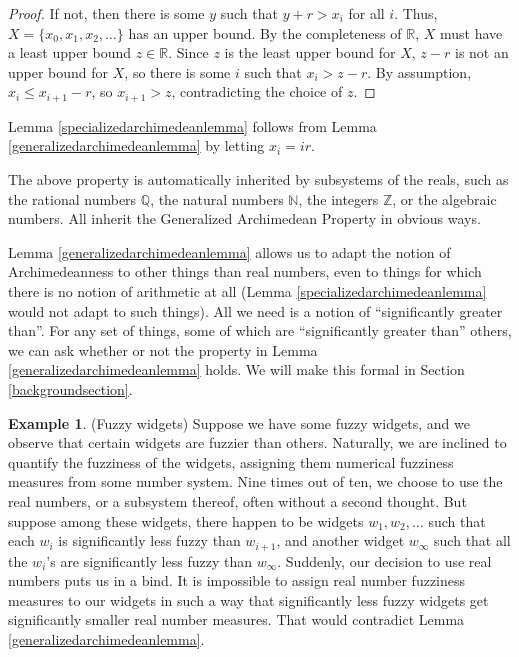 \documentclass[reqno]{article}
\theoremstyle{definition}
\newtheorem{example}[theorem]{Example}
\begin{document}
\begin{proof}
If not, then there is some $y$ such that $y+r > x_i$ for all $i$.
Thus, $X=\{x_0,x_1,x_2,\ldots\}$ has an upper bound. By the completeness
of $\mathbb R$, $X$ must have a least upper bound $z\in\mathbb R$.
Since $z$ is the least upper bound for $X$, $z-r$ is not an upper bound
for $X$, so there is some $i$ such that $x_i>z-r$.
By assumption, $x_i\leq x_{i+1}-r$, so $x_{i+1}>z$, contradicting the choice
of $z$.
\end{proof}

Lemma \ref{specializedarchimedeanlemma} follows from
Lemma \ref{generalizedarchimedeanlemma} by letting $x_i=ir$.

The above property is automatically inherited by subsystems
of the reals, such as the rational numbers $\mathbb Q$, the natural
numbers $\mathbb N$, the integers $\mathbb Z$, or the algebraic numbers.
All inherit the Generalized Archimedean Property in obvious ways.

Lemma \ref{generalizedarchimedeanlemma} allows us to adapt the notion
of Archimedeanness to other things than real numbers, even to things
for which there is no notion of arithmetic at all
(Lemma \ref{specializedarchimedeanlemma} would not adapt to such things).
All we need is a notion of ``significantly greater than''.
For any set of things, some of which are ``significantly greater than''
others, we can ask whether or not the property in Lemma
\ref{generalizedarchimedeanlemma} holds. We will make this formal in
Section \ref{backgroundsection}.

\begin{example}
\label{fuzzywidgets}
(Fuzzy widgets)
Suppose we have some fuzzy widgets, and we observe that certain
widgets are fuzzier than others. Naturally, we are inclined to
quantify the fuzziness of the widgets, assigning them numerical
fuzziness measures from some number system. Nine times out of ten,
we choose to use the real numbers, or a subsystem thereof,
often without a second thought. But suppose
among these widgets, there happen to be widgets $w_1,w_2,\ldots$
such that each $w_{i}$ is significantly less fuzzy than $w_{i+1}$,
and another widget $w_\infty$ such that all the $w_i$'s are
significantly less fuzzy than $w_\infty$.
Suddenly, our decision to use real numbers puts us in a bind.
It is impossible to assign real number fuzziness measures to our
widgets in such a way that significantly less fuzzy widgets get
significantly smaller real number measures. That would
contradict Lemma \ref{generalizedarchimedeanlemma}.
\end{example}
\end{document}

